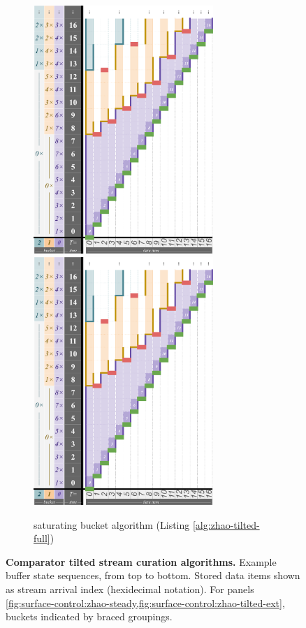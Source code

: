 \begin{figure}
\begin{subfigure}{0.37\linewidth}
\centering
\includegraphics[height=3.7in,trim={6.8cm 0 0 0},clip]{img/surface-control-tall-zhao-full}
~
\includegraphics[height=3.7in,trim={0 0 21.2cm 0},clip]{img/surface-control-tall-zhao-full}
\centering
\caption{saturating bucket algorithm (Listing \ref{alg:zhao-tilted-full})}
\label{fig:surface-control-tilted:saturating-bucket}
\end{subfigure}

\caption{%
\textbf{Comparator tilted stream curation algorithms.}
\footnotesize
Example buffer state sequences, from top to bottom.
Stored data items shown as stream arrival index (hexidecimal notation).
For panels \cref{fig:surface-control:zhao-steady,fig:surface-control:zhao-tilted-ext}, buckets indicated by braced groupings.
}
\label{fig:surface-control-tilted}

\end{figure}
